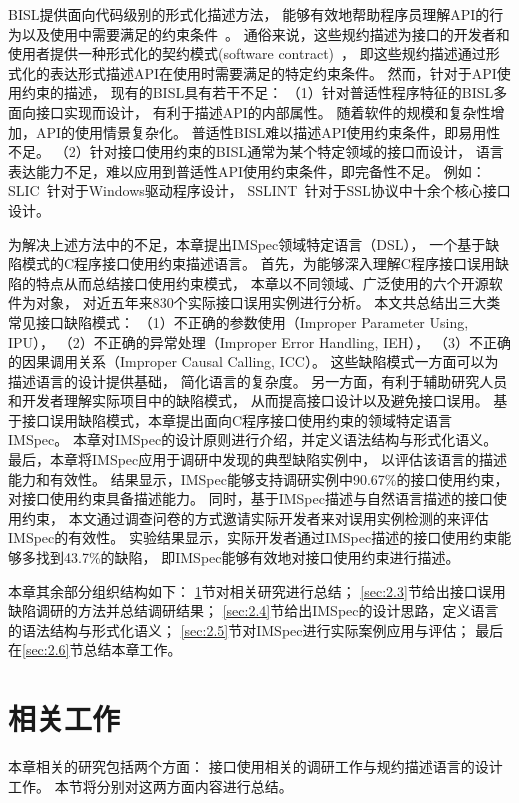 BISL提供面向代码级别的形式化描述方法，
能够有效地帮助程序员理解API的行为以及使用中需要满足的约束条件~\cite{survey12}。
通俗来说，这些规约描述为接口的开发者和使用者提供一种形式化的契约模式(software contract)~\cite{92-ieee-contract}，
即这些规约描述通过形式化的表达形式描述API在使用时需要满足的特定约束条件。
然而，针对于API使用约束的描述，
现有的BISL具有若干不足：
（1）针对普适性程序特征的BISL多面向接口实现而设计，
有利于描述API的内部属性。
随着软件的规模和复杂性增加，API的使用情景复杂化。
普适性BISL难以描述API使用约束条件，即易用性不足。
（2）针对接口使用约束的BISL通常为某个特定领域的接口而设计，
语言表达能力不足，难以应用到普适性API使用约束条件，即完备性不足。
例如：SLIC~\cite{01-slic}针对于Windows驱动程序设计，
SSLINT~\cite{15-sp-sslint}针对于SSL协议中十余个核心接口设计。


为解决上述方法中的不足，本章提出IMSpec领域特定语言（DSL），
一个基于缺陷模式的C程序接口使用约束描述语言。
首先，为能够深入理解C程序接口误用缺陷的特点从而总结接口使用约束模式，
本章以不同领域、广泛使用的六个开源软件为对象，
对近五年来830个实际接口误用实例进行分析。
本文共总结出三大类常见接口缺陷模式：
（1）不正确的参数使用（Improper Parameter Using, IPU），
（2）不正确的异常处理（Improper Error Handling, IEH），
（3）不正确的因果调用关系（Improper Causal Calling, ICC）。
这些缺陷模式一方面可以为描述语言的设计提供基础，
简化语言的复杂度。
另一方面，有利于辅助研究人员和开发者理解实际项目中的缺陷模式，
从而提高接口设计以及避免接口误用。
基于接口误用缺陷模式，本章提出面向C程序接口使用约束的领域特定语言IMSpec。
本章对IMSpec的设计原则进行介绍，并定义语法结构与形式化语义。
最后，本章将IMSpec应用于调研中发现的典型缺陷实例中，
以评估该语言的描述能力和有效性。
结果显示，IMSpec能够支持调研实例中90.67\%的接口使用约束，
对接口使用约束具备描述能力。
同时，基于IMSpec描述与自然语言描述的接口使用约束，
本文通过调查问卷的方式邀请实际开发者来对误用实例检测的来评估IMSpec的有效性。
实验结果显示，实际开发者通过IMSpec描述的接口使用约束能够多找到43.7\%的缺陷，
即IMSpec能够有效地对接口使用约束进行描述。


本章其余部分组织结构如下：
\ref{sec:2.2}节对相关研究进行总结；
\ref{sec:2.3}节给出接口误用缺陷调研的方法并总结调研结果；
\ref{sec:2.4}节给出IMSpec的设计思路，定义语言的语法结构与形式化语义；
\ref{sec:2.5}节对IMSpec进行实际案例应用与评估；
最后在\ref{sec:2.6}节总结本章工作。

\section{相关工作}
\label{sec:2.2}
本章相关的研究包括两个方面：
接口使用相关的调研工作与规约描述语言的设计工作。
本节将分别对这两方面内容进行总结。

